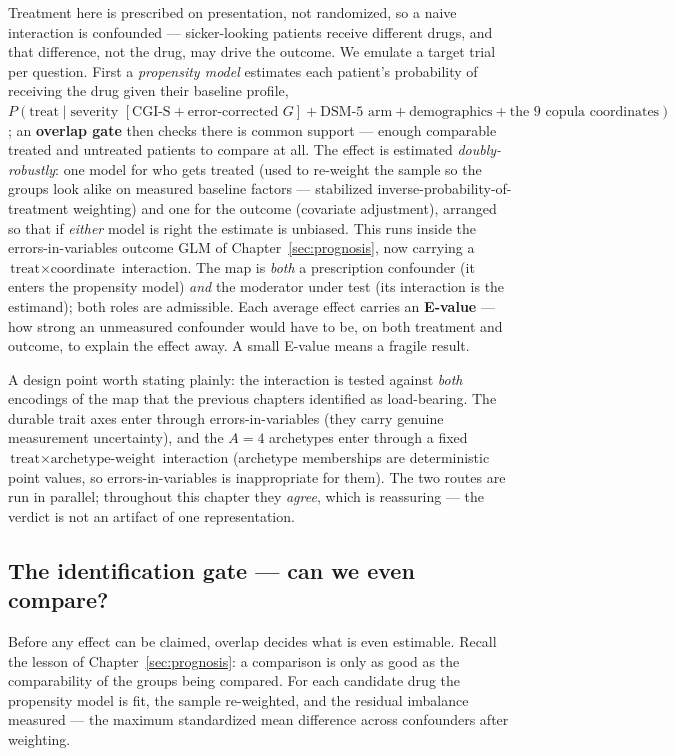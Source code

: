 \begin{methodsbox}
Treatment here is prescribed on presentation, not randomized, so a naive interaction is confounded ---
sicker-looking patients receive different drugs, and that difference, not the drug, may drive the outcome. We
emulate a target trial per question. First a \emph{propensity model} estimates each patient's probability of
receiving the drug given their baseline profile,
$P(\text{treat}\mid\text{severity }[\text{CGI-S}+\text{error-corrected }G]+\text{DSM-5 arm}+\text{demographics}+\text{the 9 copula coordinates})$;
an \textbf{overlap gate} then checks there is common support --- enough comparable treated and untreated patients
to compare at all. The effect is estimated \emph{doubly-robustly}: one model for who gets treated (used to
re-weight the sample so the groups look alike on measured baseline factors --- stabilized
inverse-probability-of-treatment weighting) and one for the outcome (covariate adjustment), arranged so that if
\emph{either} model is right the estimate is unbiased. This runs inside the errors-in-variables outcome GLM of
Chapter~\ref{sec:prognosis}, now carrying a $\text{treat}\times\text{coordinate}$ interaction. The map is
\emph{both} a prescription confounder (it enters the propensity model) \emph{and} the moderator under test (its
interaction is the estimand); both roles are admissible. Each average effect carries an \textbf{E-value} --- how
strong an unmeasured confounder would have to be, on both treatment and outcome, to explain the effect away. A
small E-value means a fragile result.
\end{methodsbox}

A design point worth stating plainly: the interaction is tested against \emph{both} encodings of the map that the
previous chapters identified as load-bearing. The durable trait axes enter through errors-in-variables (they
carry genuine measurement uncertainty), and the $A{=}4$ archetypes enter through a fixed
$\text{treat}\times\text{archetype-weight}$ interaction (archetype memberships are deterministic point values, so
errors-in-variables is inappropriate for them). The two routes are run in parallel; throughout this chapter they
\emph{agree}, which is reassuring --- the verdict is not an artifact of one representation.

\subsection{The identification gate --- can we even compare?}
\label{sub:m5ident}
Before any effect can be claimed, overlap decides what is even estimable. Recall the lesson of
Chapter~\ref{sec:prognosis}: a comparison is only as good as the comparability of the groups being compared. For
each candidate drug the propensity model is fit, the sample re-weighted, and the residual imbalance measured ---
the maximum standardized mean difference across confounders after weighting.

